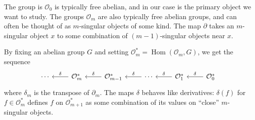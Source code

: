 The group is \(\mathcal{O}_{0}\) is typically free abelian, and in our case is the primary object we want to study. The groups \(\mathcal{O}_{m}\) are also typically free abelian groups, and can often be thought of as \(m\)-singular objects of some kind. The map \(\partial\) takes an \(m\)-singular object \(x\) to some combination of \((m - 1)\)-singular objects near \(x\).

By fixing an abelian group \(G\) and setting \(\mathcal{O}_{m}^{\ast} = \operatorname{Hom}(\mathcal{O}_{m}, G)\), we get the sequence
\[\begin{tikzcd}
	\cdots & {\mathcal{O}_{m}^{\ast}} & {\mathcal{O}_{m - 1}^{\ast}} & \cdots & {\mathcal{O}_{1}^{\ast}} & {\mathcal{O}_{0}^{\ast}}
	\arrow["\delta"', from=1-2, to=1-1]
	\arrow["\delta"', from=1-3, to=1-2]
	\arrow["\delta"', from=1-4, to=1-3]
	\arrow["\delta"', from=1-5, to=1-4]
	\arrow["\delta"', from=1-6, to=1-5]
\end{tikzcd}\]
where \(\delta_{m}\) is the transpose of \(\partial_{m}\). The maps \(\delta\) behaves like derivatives: \(\delta(f)\) for \(f \in \mathcal{O}_{m}^{\ast}\) defines \(f\) on \(\mathcal{O}_{m + 1}^{\ast}\) as some combination of its values on ``close'' \(m\)-singular objects.

